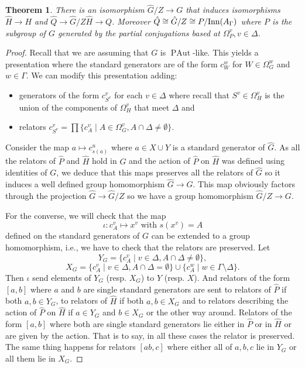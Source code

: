 \documentclass[10pt]{amsart}
\newtheorem{theorem}{Theorem}[section]
\theoremstyle{definition}
\newcommand{\Inn}{{\rm Inn}}
\newcommand{\PAut}{\operatorname{PAut}}
\theoremstyle{definition}
\numberwithin{equation}{section}
\begin{document}
\begin{theorem} There is an isomorphism $\hat G/Z\to G$ that induces isomorphisms $\hat H\to H$ and $\hat Q\to\hat G/Z\hat H\to Q$. Moreover $\hat Q\cong\hat G/Z\cong P/\Inn(A_\Gamma)$ where $P$ is the subgroup of $G$ generated by the partial conjugations based at $\Omega_P^v,v\in\Delta$. 
\end{theorem}
\begin{proof} Recall that we are assuming that $G$ is $\PAut$-like. This yields a presentation where the standard generators are of the form $c^w_W$ for $W\in\Omega^w_G$ and $w\in\Gamma$. We can modify this presentation adding:

\begin{itemize}
\item[i)] generators of the form $c^v_{S^v}$ for each $v\in\Delta$ where recall that $S^v\in\Omega^v_H$ is the union of the components of $\Omega^v_H$ that meet $\Delta$ and 
\item[ii)] relators $c^v_{S^v}=\prod\{c^v_A\mid A\in\Omega^v_G,A\cap\Delta\neq\emptyset\}$.
\end{itemize}
Consider the map
$a\mapsto c^u_{s(a)}$ where $a\in X\cup Y$ is a standard generator of $\hat G$. As all the relators of $\hat P$ and $\hat H$ hold in $G$ and the action of $\hat P$ on $\hat H$ was defined using  identities of $G$, we deduce that this maps preserves all the relators of $\hat G$ so it induces a well defined group homomorphism $\hat G\to G$. This map obviously factors through the projection $\hat G\to \hat G/Z$ so we have a group homomorphism $\hat G/Z\to G$. 

For the converse, we will check that the map
\[
\iota \colon c^v_A\mapsto
x^v\text{ with }s(x^v)=A\]
defined on the standard generators of $G$ can be extended to a group homomorphism, i.e., we have to check that the relators are preserved. Let
\[Y_G=\{c^v_A\mid v\in\Delta,A\cap\Delta\neq\emptyset\},\]
\[X_G=\{c^v_A\mid v\in\Delta,A\cap\Delta=\emptyset\}\cup\{c^w_A\mid w\in\Gamma\setminus\Delta\}.\]
Then $\iota$ send elements of $Y_G$ (resp. $X_G$) to $Y$ (resp. $X$). And relators of the form $[a,b]$ where $a$ and $b$ are single standard generators are sent to relators of $\hat P$ if both $a,b\in Y_G$, to relators of $\hat H$ if both $a,b\in X_G$ and to relators describing the action of $\hat P$ on $\hat H$ if $a\in Y_G$ and $b\in X_G$ or the other way around. 
 Relators of the form $[a,b]$ where both are single standard generators lie either in $\hat P$ or in $\hat H$ or are given by the action. That is to say, in all these cases the relator is preserved. The same thing happens for relators $[ab,c]$ where either all of $a,b,c$ lie in $Y_G$ or all them lie in $X_G$.


\end{proof}
\end{document}
